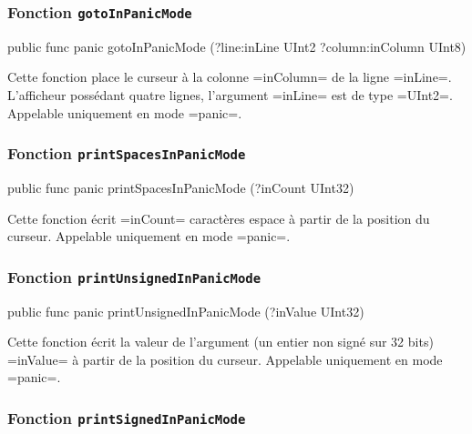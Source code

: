 \subsubsection{Fonction \texttt{gotoInPanicMode}}

\begin{OMNIBUS}
public func panic gotoInPanicMode (?line:inLine UInt2
                                   ?column:inColumn UInt8)
\end{OMNIBUS}

Cette fonction place le curseur à la colonne \omnibus=inColumn= de la ligne \omnibus=inLine=. L'afficheur possédant quatre lignes, l'argument \omnibus=inLine= est de type \omnibus=UInt2=. Appelable uniquement en mode \omnibus=panic=.




\subsubsection{Fonction \texttt{printSpacesInPanicMode}}

\begin{OMNIBUS}
public func panic printSpacesInPanicMode (?inCount UInt32)
\end{OMNIBUS}

Cette fonction écrit \omnibus=inCount= caractères espace à partir de la position du curseur. Appelable uniquement en mode \omnibus=panic=.





\subsubsection{Fonction \texttt{printUnsignedInPanicMode}}

\begin{OMNIBUS}
public func panic printUnsignedInPanicMode (?inValue UInt32)
\end{OMNIBUS}

Cette fonction écrit la valeur de l'argument (un entier non signé sur 32 bits) \omnibus=inValue= à partir de la position du curseur. Appelable uniquement en mode \omnibus=panic=.






\subsubsection{Fonction \texttt{printSignedInPanicMode}}

